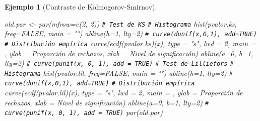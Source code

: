 \documentclass[
]{book}
\newenvironment{Shaded}{\begin{snugshade}}{\end{snugshade}}
\newcommand{\AttributeTok}[1]{\textcolor[rgb]{0.77,0.63,0.00}{#1}}
\newcommand{\CommentTok}[1]{\textcolor[rgb]{0.56,0.35,0.01}{\textit{#1}}}
\newcommand{\ConstantTok}[1]{\textcolor[rgb]{0.00,0.00,0.00}{#1}}
\newcommand{\DecValTok}[1]{\textcolor[rgb]{0.00,0.00,0.81}{#1}}
\newcommand{\FunctionTok}[1]{\textcolor[rgb]{0.00,0.00,0.00}{#1}}
\newcommand{\NormalTok}[1]{#1}
\newcommand{\OtherTok}[1]{\textcolor[rgb]{0.56,0.35,0.01}{#1}}
\newcommand{\StringTok}[1]{\textcolor[rgb]{0.31,0.60,0.02}{#1}}
\theoremstyle{break}
\newtheorem{example}{Ejemplo}[chapter]
\theoremstyle{nonumberplain}
\renewcommand{\CommentTok}[1]{\textcolor[rgb]{0.41,0.41,0.41}{\texttt{#1}}}
\begin{document}
\begin{example}[Contraste de Kolmogorov-Smirnov]
\begin{Shaded}
\begin{Highlighting}[]
\NormalTok{old.par }\OtherTok{\textless{}{-}} \FunctionTok{par}\NormalTok{(}\AttributeTok{mfrow=}\FunctionTok{c}\NormalTok{(}\DecValTok{2}\NormalTok{, }\DecValTok{2}\NormalTok{))}
\CommentTok{\# Test de KS}
  \CommentTok{\# Histograma}
\FunctionTok{hist}\NormalTok{(pvalor.ks, }\AttributeTok{freq=}\ConstantTok{FALSE}\NormalTok{, }\AttributeTok{main =} \StringTok{""}\NormalTok{)}
\FunctionTok{abline}\NormalTok{(}\AttributeTok{h=}\DecValTok{1}\NormalTok{, }\AttributeTok{lty=}\DecValTok{2}\NormalTok{)   }\CommentTok{\# curve(dunif(x,0,1), add=TRUE)}
  \CommentTok{\# Distribución empírica}
\FunctionTok{curve}\NormalTok{(}\FunctionTok{ecdf}\NormalTok{(pvalor.ks)(x), }\AttributeTok{type =} \StringTok{"s"}\NormalTok{, }\AttributeTok{lwd =} \DecValTok{2}\NormalTok{, }\AttributeTok{main =} \StringTok{\textquotesingle{}\textquotesingle{}}\NormalTok{, }
      \AttributeTok{ylab =} \StringTok{\textquotesingle{}Proporción de rechazos\textquotesingle{}}\NormalTok{, }\AttributeTok{xlab =} \StringTok{\textquotesingle{}Nivel de significación\textquotesingle{}}\NormalTok{)}
\FunctionTok{abline}\NormalTok{(}\AttributeTok{a=}\DecValTok{0}\NormalTok{, }\AttributeTok{b=}\DecValTok{1}\NormalTok{, }\AttributeTok{lty=}\DecValTok{2}\NormalTok{)   }\CommentTok{\# curve(punif(x, 0, 1), add = TRUE)}
\CommentTok{\# Test de Lilliefors}
  \CommentTok{\# Histograma}
\FunctionTok{hist}\NormalTok{(pvalor.lil, }\AttributeTok{freq=}\ConstantTok{FALSE}\NormalTok{, }\AttributeTok{main =} \StringTok{""}\NormalTok{)}
\FunctionTok{abline}\NormalTok{(}\AttributeTok{h=}\DecValTok{1}\NormalTok{, }\AttributeTok{lty=}\DecValTok{2}\NormalTok{)   }\CommentTok{\# curve(dunif(x,0,1), add=TRUE)}
  \CommentTok{\# Distribución empírica}
\FunctionTok{curve}\NormalTok{(}\FunctionTok{ecdf}\NormalTok{(pvalor.lil)(x), }\AttributeTok{type =} \StringTok{"s"}\NormalTok{, }\AttributeTok{lwd =} \DecValTok{2}\NormalTok{, }\AttributeTok{main =} \StringTok{\textquotesingle{}\textquotesingle{}}\NormalTok{, }
      \AttributeTok{ylab =} \StringTok{\textquotesingle{}Proporción de rechazos\textquotesingle{}}\NormalTok{,  }\AttributeTok{xlab =} \StringTok{\textquotesingle{}Nivel de significación\textquotesingle{}}\NormalTok{)}
\FunctionTok{abline}\NormalTok{(}\AttributeTok{a=}\DecValTok{0}\NormalTok{, }\AttributeTok{b=}\DecValTok{1}\NormalTok{, }\AttributeTok{lty=}\DecValTok{2}\NormalTok{)   }\CommentTok{\# curve(punif(x, 0, 1), add = TRUE)}
\FunctionTok{par}\NormalTok{(old.par)}
\end{Highlighting}
\end{Shaded}


\end{example}
\end{document}
